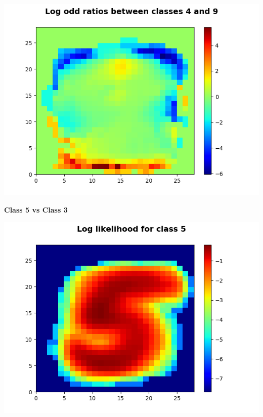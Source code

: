 \documentclass[11pt]{article}
\begin{document}
\begin{center}
\includegraphics[scale=1]{part1/1/odd_ratio_4_9.png}
\end{center}

\pagebreak
\textbf{Class 5 vs Class 3}\\
\begin{center}
\includegraphics[scale=0.75]{part1/1/log_likelihood_5.png}
\end{center}
\end{document}
